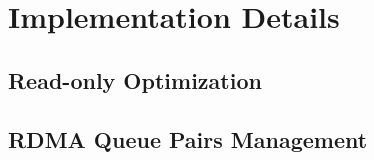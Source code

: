 % 
% 



\section{Implementation Details} \label{sec:impl}

\subsection{Read-only Optimization} \label{sec:readopt}



\subsection{RDMA Queue Pairs Management} \label{sec:qp}


